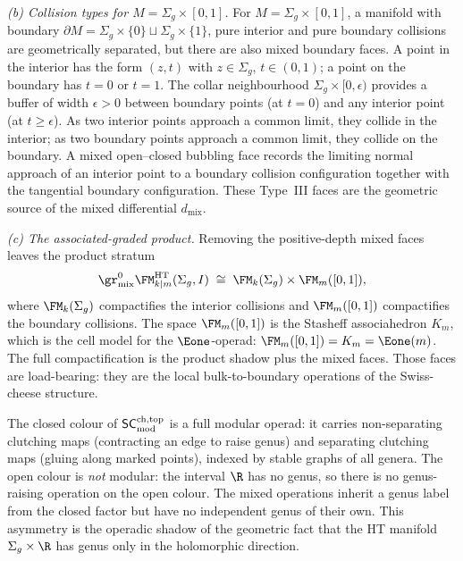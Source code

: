 \begin{remark}
\medskip\noindent
\emph{(b) Collision types for
$M = \Sigma_g \times [0,1]$.}
For $M = \Sigma_g \times [0,1]$, a manifold with boundary
$\partial M = \Sigma_g \times \{0\} \sqcup \Sigma_g \times \{1\}$,
pure interior and pure boundary collisions are geometrically
separated, but there are also mixed boundary faces.
A point in the interior has the form $(z, t)$ with
$z \in \Sigma_g$, $t \in (0,1)$; a point on the boundary has
$t = 0$ or $t = 1$. The collar neighbourhood
$\Sigma_g \times [0, \epsilon)$ provides a buffer of width
$\epsilon > 0$ between boundary points (at $t = 0$) and any
interior point (at $t \ge \epsilon$). As two interior points
approach a common limit, they collide in the interior; as two
boundary points approach a common limit, they collide on the
boundary. A mixed open--closed bubbling face records the limiting
normal approach of an interior point to a boundary collision
configuration together with the tangential boundary configuration.
These Type~III faces are the geometric source of the mixed
differential $d_{\mathrm{mix}}$.

\medskip\noindent
\emph{(c) The associated-graded product.}
Removing the positive-depth mixed faces leaves the product
stratum
\[
 \gr^0_{\mathrm{mix}}\FM^{\mathrm{HT}}_{k|m}(\Sigma_g,I)
 \;\cong\;
 \FM_k(\Sigma_g) \times \FM_m([0,1]),
\]
where $\FM_k(\Sigma_g)$ compactifies the interior collisions
and $\FM_m([0,1])$ compactifies the boundary collisions.
The space $\FM_m([0,1])$ is the Stasheff associahedron $K_m$,
which is the cell model for the $\Eone$-operad:
$\FM_m([0,1]) = K_m = \Eone(m)$. The full compactification is
the product shadow plus the mixed faces. Those faces are
load-bearing: they are the local bulk-to-boundary operations of
the Swiss-cheese structure.
\end{remark}

\begin{remark}
\label{rem:partially-modular}
The closed colour of $\mathsf{SC}^{\mathrm{ch,top}}_{\mathrm{mod}}$ is a full modular operad: it
carries non-separating clutching maps (contracting an edge to
raise genus) and separating clutching maps (gluing along marked
points), indexed by stable graphs of all genera. The open colour
is \emph{not} modular: the interval $\R$ has no genus, so there
is no genus-raising operation on the open colour. The mixed
operations inherit a genus label from the closed factor but have
no independent genus of their own. This asymmetry is the
operadic shadow of the geometric fact that the HT manifold
$\Sigma_g \times \R$ has genus only in the holomorphic direction.
\end{remark}

